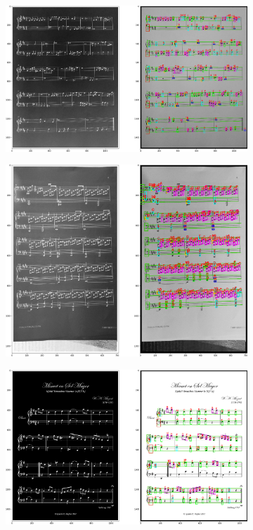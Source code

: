 \documentclass[12pt]{article}
\begin{document}
\begin{enumerate}
\begin{figure}[h!]
\begin{subfigure}[b]{0.48\linewidth}
				\end{subfigure}
				\begin{subfigure}[b]{0.48\linewidth}
					\includegraphics[width=\linewidth]{Eazy/Zdj27.png}
				\end{subfigure}
				\begin{subfigure}[b]{0.48\linewidth}
					\includegraphics[width=\linewidth]{Eazy/Zdj28.png}
				\end{subfigure}
				\begin{subfigure}[b]{0.48\linewidth}
					\includegraphics[width=\linewidth]{Eazy/Zdj29.png}

\end{subfigure}
\end{figure}
\end{enumerate}
\end{document}
